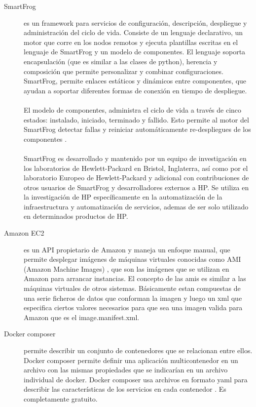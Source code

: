 \begin{description}
\item [SmartFrog]
 es un framework para servicios de configuración, descripción, despliegue y administración del ciclo de vida. Consiste de un lenguaje declarativo, un motor que corre en los nodos remotos y ejecuta plantillas escritas en el lenguaje de SmartFrog y un modelo de componentes. El lenguaje soporta encapsulación (que es similar a las clases de python), herencia y composición que permite personalizar y combinar configuraciones. SmartFrog, permite enlaces estáticos y dinámicos entre componentes, que ayudan a soportar diferentes formas de conexión en tiempo de despliegue.\\
\\
El modelo de componentes, administra el ciclo de vida a través de cinco estados: instalado, iniciado, terminado y fallido. Esto permite al motor del SmartFrog detectar fallas y reiniciar automáticamente re-despliegues de los componentes \cite{Smart09}.\\
\\
SmartFrog es desarrollado y mantenido por un equipo de investigación en los laboratorios de Hewlett-Packard en Bristol, Inglaterra, así como por el laboratorio Europeo de Hewlett-Packard y adicional con contribuciones de otros usuarios de SmartFrog y desarrolladores externos a HP. Se utiliza en la investigación de HP específicamente en la automatización de la infraestructura y automatización de servicios, ademas de ser solo utilizado en determinados productos de HP.

\item [Amazon EC2]
es un API propietario de Amazon y maneja un enfoque manual, que permite desplegar imágenes de máquinas virtuales conocidas como AMI (Amazon Machine Images) \cite{Amazon16}, que son las imágenes que se utilizan en Amazon para arrancar instancias. El concepto de las amis es similar a las máquinas virtuales de otros sistemas. Básicamente estan compuestas de una serie ficheros de datos que conforman la imagen y luego un xml que especifica ciertos valores necesarios para que sea una imagen valida para Amazon que es el image.manifest.xml. 

\item [Docker composer]
permite describir un conjunto de contenedores que se relacionan entre ellos. Docker composer permite definir una aplicación multicontenedor en un archivo con las mismas propiedades que se indicarían en un archivo individual de docker. Docker composer usa archivos en formato yaml para describir las características de los servicios en cada contenedor \cite{doccom16}. Es completamente gratuito. 


\end{description}

